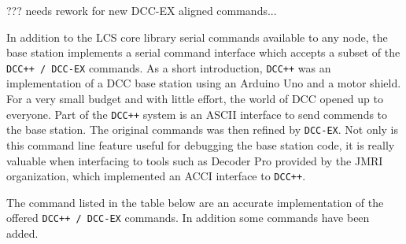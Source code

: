 
??? needs rework for new DCC-EX aligned commands...


In addition to the LCS core library serial commands available to any node, the base station implements a serial command interface which accepts a subset of the \texttt{DCC++ / DCC-EX} commands. As a short introduction, \texttt{DCC++} was an implementation of a DCC base station using an Arduino Uno and a motor shield. For a very small budget and with little effort, the world of DCC opened up to everyone. Part of the \texttt{DCC++} system is an ASCII interface to send commends to the base station. The original commands was then refined by \texttt{DCC-EX}. Not only is this command line feature useful for debugging the base station code, it is really valuable when interfacing to tools such as Decoder Pro provided by the JMRI organization, which implemented an ACCI interface to \texttt{DCC++}.

The command listed in the table below are an accurate implementation of the offered \texttt{DCC++ / DCC-EX} commands. In addition some commands have been added.

